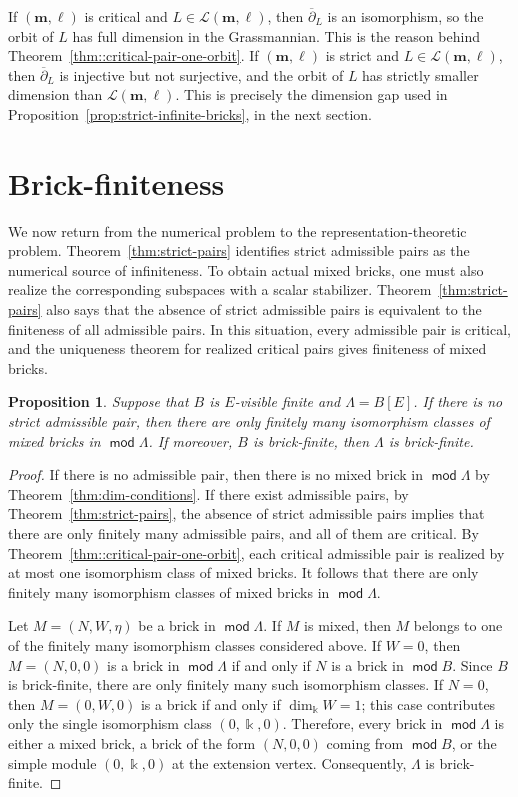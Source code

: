 \documentclass[a4,12pt]{amsart}
\numberwithin{equation}{section} %
\def\mod{\operatorname{\mathsf{mod}}}
\newtheorem{proposition}[theorem]{Proposition} %
\theoremstyle{definition} %
\begin{document}
If $(\mathbf{m},\ell)$ is critical and $L\in\mathcal{L}(\mathbf{m},\ell)$, then $\overline{\partial}_L$ is an isomorphism, so the orbit of $L$ has full dimension in the Grassmannian. This is the reason behind Theorem~\ref{thm::critical-pair-one-orbit}. If $(\mathbf{m},\ell)$ is strict and $L\in\mathcal{L}(\mathbf{m},\ell)$, then $\overline{\partial}_L$ is injective but not surjective, and the orbit of $L$ has strictly smaller dimension than $\mathcal{L}(\mathbf{m},\ell)$. This is precisely the dimension gap used in Proposition~\ref{prop:strict-infinite-bricks}, in the next section.


\section{Brick-finiteness}\label{Section-4}
We now return from the numerical problem to the representation-theoretic problem. 
Theorem~\ref{thm:strict-pairs} identifies strict admissible pairs as the numerical source of infiniteness. To obtain actual mixed bricks, one must also realize the corresponding subspaces with a scalar stabilizer. Theorem~\ref{thm:strict-pairs} also says that the absence of strict admissible pairs is equivalent to the finiteness of all admissible pairs. In this situation, every admissible pair is critical, and the uniqueness theorem for realized critical pairs gives finiteness of mixed bricks.

\begin{proposition}\label{prop::mixed-bricks-finite}
Suppose that $B$ is $E$-visible finite and $\Lambda=B[E]$. If there is no strict admissible pair, then there are only finitely many isomorphism classes of mixed bricks in $\mod \Lambda$. If moreover, $B$ is brick-finite, then $\Lambda$ is brick-finite.
\end{proposition}
\begin{proof}
If there is no admissible pair, then there is no mixed brick in $\mod \Lambda$ by Theorem~\ref{thm:dim-conditions}. If there exist admissible pairs, by Theorem~\ref{thm:strict-pairs}, the absence of strict admissible
pairs implies that there are only finitely many admissible pairs,
and all of them are critical. By
Theorem~\ref{thm::critical-pair-one-orbit}, each critical admissible
pair is realized by at most one isomorphism class of mixed bricks.
It follows that there are only finitely many isomorphism classes of
mixed bricks in $\mod\Lambda$.

Let $M=(N,W,\eta)$ be a brick in $\mod \Lambda$. If $M$ is mixed, then $M$ belongs to one of the finitely many isomorphism classes considered above. If $W=0$, then $M=(N,0,0)$ is a brick in $\mod \Lambda$ if and only if $N$ is a brick in $\mod B$. Since $B$ is brick-finite, there are only finitely many such isomorphism classes. If $N=0$, then $M=(0,W,0)$ is a brick if and only if $\dim_{\Bbbk} W=1$; this case contributes only the single isomorphism class $(0,\Bbbk,0)$. Therefore, every brick in $\mod \Lambda$ is either a mixed brick, a brick of the form $(N,0,0)$ coming from $\mod B$, or the simple module $(0,\Bbbk,0)$ at the extension vertex. Consequently, $\Lambda$ is brick-finite.
\end{proof}
\end{document}
